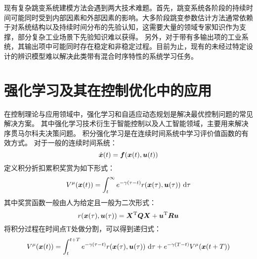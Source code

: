现有复杂跳变系统建模方法会遇到两大技术难题。首先，跳变系统各阶段的持续时间可能同时受到内部因素和外部因素的影响。大多阶段跳变参数估计方法通常依赖于对系统结构以及持续时间分布的先验认知，这需要大量的领域专家知识作为支撑，部分复杂工业场景下先验知识难以获得。
另外，对于带有多输出项的工业系统，其输出项中可能同时存在稳定和非稳定过程\cite{nason2006stationary}。目前为止，现有的未经过特定设计的辨识模型难以解决此类带有混合时序特性的系统学习任务。



\section{强化学习及其在控制优化中的应用}
在控制理论与应用领域中，强化学习\cite{Sutton2018}和自适应动态规划\cite{powell2007approximate,zhang2012adaptive}是解决最优控制问题的常见解决方案。
其中强化学习技术衍生于智能控制以及人工智能领域，主要用来解决序贯马尔科夫决策问题。
积分强化学习是在连续时间系统中学习评价值函数的有效方式。
对于一般的连续时间系统：
\begin{equation}
    \dot{\boldsymbol{x}}(t)=\boldsymbol f(\boldsymbol{x}(t), \boldsymbol{u}({t}))
\end{equation}
定义积分折扣累积奖赏为如下形式：
\begin{equation}
    V^\mu(\boldsymbol x(t))=\int_t^{\infty} e^{-\gamma(\tau-t)} r(\boldsymbol x(\tau), \boldsymbol u(\tau)) \mathrm{~d} \tau
 \end{equation}
其中奖赏函数一般由人为给定且一般为二次形式：
 \begin{equation}
    r(\boldsymbol x(\tau), \boldsymbol u(\tau))=\boldsymbol X^{\mathrm{T}} \boldsymbol Q \boldsymbol X+\boldsymbol u^{\mathrm{T}} \boldsymbol R \boldsymbol u
\end{equation}
将积分过程在时间点T处做分割，可以得到递归式：
\begin{equation}
    V^\mu(\boldsymbol x(t))=\int_t^{t+T} e^{-\gamma(\tau-t)} r(\boldsymbol x(\tau), \boldsymbol u(\tau)) \mathrm{~d} \tau+e^{-\gamma(T-t)} V^\mu(\boldsymbol x(t+T))
\end{equation}

